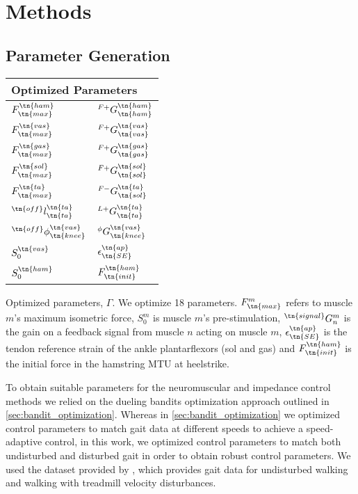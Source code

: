 \section{Methods}

\subsection{Parameter Generation}
\begin{margintable}    
    \centering
    \normalsize
    \begin{tabular}{ll}
        \multicolumn{2}{l}{Optimized Parameters} \\
        \midrule
        $F_\tn{max}^\tn{ham}$              & $^{F+}G_\tn{ham}^\tn{ham}$   \\
        $F_\tn{max}^\tn{vas}$              & $^{F+}G_\tn{vas}^\tn{vas}$   \\
        $F_\tn{max}^\tn{gas}$              & $^{F+}G_\tn{gas}^\tn{gas}$   \\
        $F_\tn{max}^\tn{sol}$              & $^{F+}G_\tn{sol}^\tn{sol}$   \\
        $F_\tn{max}^\tn{ta}$               & $^{F-}G_\tn{sol}^\tn{ta}$    \\
        $^\tn{off}l_\tn{ta}^\tn{ta}$       & $^{L+}G_\tn{ta}^\tn{ta}$     \\
        $^\tn{off}\phi_\tn{knee}^\tn{vas}$ & ${^\phi}G_\tn{knee}^\tn{vas}$ \\
        $S_0^\tn{vas}$                     & $\epsilon_\tn{SE}^\tn{ap}$   \\
        $S_0^\tn{ham}$                     & $F_\tn{init}^\tn{ham}$       \\
    \end{tabular}
    \caption[Parameters optimized for parameter set generation for experiment
    comparing neuromuscular and impedance control]{Optimized parameters,
    $\Gamma$. We optimize 18 parameters. $F_\tn{max}^m$ refers to muscle $m$'s
    maximum isometric force, $S_0^m$ is muscle $m$'s pre-stimulation,
    $^\tn{signal} G_n^m$ is the gain on a feedback signal from muscle $n$
    acting on muscle $m$, $\epsilon_\tn{SE}^\tn{ap}$ is the tendon reference
    strain of the ankle plantarflexors (sol and gas) and $F_\tn{init}^\tn{ham}$
    is the initial force in the hamstring MTU at
    heelstrike.}\label{tab:nm_params_treadmill_exp}
\end{margintable}
To obtain suitable parameters for the neuromuscular and impedance control
methods we relied on the dueling bandits optimization approach outlined in
\cref{sec:bandit_optimization}. Whereas in \cref{sec:bandit_optimization} we
optimized control parameters to match gait data at different speeds to achieve a
speed-adaptive control, in this work, we optimized control parameters to match
both undisturbed and disturbed gait in order to obtain robust control
parameters. We used the dataset provided by \citet{moore2015elaborate}, which
provides gait data for undisturbed walking and walking with treadmill velocity
disturbances. 


